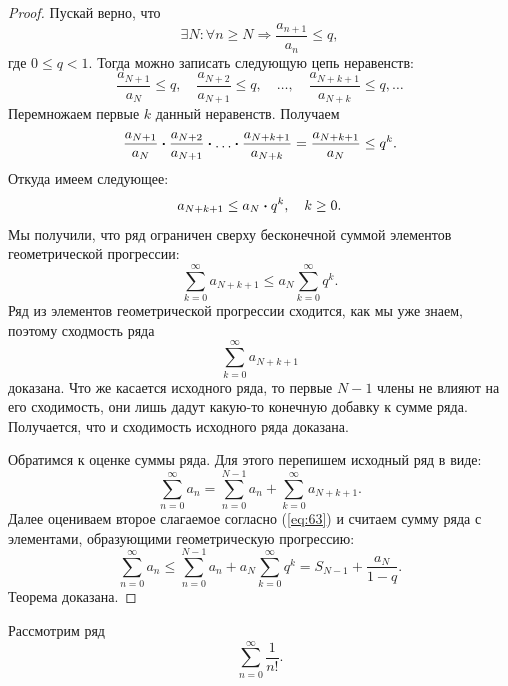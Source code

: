 \documentclass[12pt]{article}
\begin{document}
\begin{proof}
Пускай верно, что 
\begin{equation}
        \exists N: \forall n \ge N \Longrightarrow \dfrac{a_{n+1}}{a_{n}} \le q,
\end{equation}
где $0 \le q < 1$. Тогда можно записать следующую цепь неравенств:
\begin{equation}
    \dfrac{a_{N+1}}{a_N} \le q,\quad \dfrac{a_{N+2}}{a_{N+1}} \le q,\quad \ldots,\quad \dfrac{a_{N+k+1}}{a_{N+k}} \le q, \ldots
\end{equation}
Перемножаем первые $k$ данный неравенств. Получаем
\begin{equation}
    \dfrac{a_{N+1}}{a_{N}}\vdot \dfrac{a_{N+2}}{a_{N+1}}\vdot\ldots\vdot \dfrac{a_{N+k+1}}{a_{N+k}} = \dfrac{a_{N+k+1}}{a_N} \le q^k.
\end{equation}
Откуда имеем следующее:
\begin{equation}
    {a_{N+k+1}} \le {a_N} \vdot q^k,\quad k \ge 0.
\end{equation}
Мы получили, что ряд ограничен сверху бесконечной суммой элементов геометрической прогрессии:
\begin{equation}\label{eq:63}
    \sum_{k=0}^{\infty} {a_{N+k+1}} \le a_N \sum_{k=0}^{\infty} q^k.
\end{equation}
Ряд из элементов геометрической прогрессии сходится, как мы уже знаем, поэтому сходмость ряда 
\begin{equation}
    \sum_{k=0}^{\infty} {a_{N+k+1}}
\end{equation}
доказана. Что же касается исходного ряда, то первые $N-1$ члены не влияют на его сходимость, они лишь дадут какую\--то конечную добавку к сумме ряда. Получается, что и сходимость исходного ряда доказана.
\par
Обратимся к оценке суммы ряда. Для этого перепишем исходный ряд в виде:
\begin{equation}
    \sum_{n=0}^{\infty}a_n = \sum_{n=0}^{N-1}a_n+\sum_{k=0}^{\infty} {a_{N+k+1}}.
\end{equation}
Далее оцениваем второе слагаемое согласно (\ref{eq:63}) и считаем сумму ряда с элементами, образующими геометрическую прогрессию:
\begin{equation}
    \sum_{n=0}^{\infty}a_n \le \sum_{n=0}^{N-1}a_n+a_N \sum_{k=0}^{\infty} q^k = S_{N-1} + \dfrac{a_N}{1-q}.
\end{equation}
Теорема доказана.
\end{proof}
Рассмотрим ряд 
\begin{equation}
    \sum_{n=0}^\infty \dfrac{1}{n!}.
\end{equation}
\end{document}
